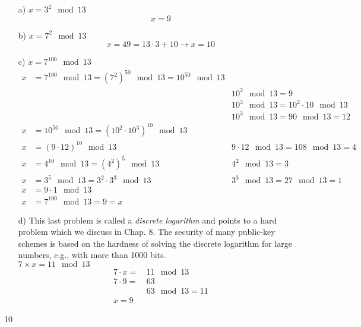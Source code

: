 \documentclass{article}
\begin{document}
\begin{enumerate}
  \setlength{\itemsep}{20pt}%
  \item[a)]  $x = 3^2 \mod 13$
  $$ \boxed{x = 9} $$

  \item[b)] $x = 7^2 \mod 13$
  $$ x = 49 = 13 \cdot 3 + 10 \rightarrow \boxed{x = 10}$$
  \item[c)] $x = 7^{100} \mod 13$
  \begin{align*}
  x &= 7^{100} \mod 13 = (7^2)^{50} \mod 13 = 10^{50} \mod 13 	& 												\\
  	&														  	& 10^2 \mod 13 = 9								\\
  	&							  	  						  	& 10^3 \mod 13 = 10^2 \cdot 10 \mod 13 			\\
  	&														  	& 10^3 \mod 13 = 90 \mod 13 = 12				\\
  x &= 10^{50} \mod 13 = (10^2 \cdot 10^3)^{10} \mod 13 		& 												\\
  x &= (9 \cdot 12)^{10} \mod 13								& 9 \cdot 12 \mod 13 = 108 \mod 13 = 4 			\\
  x &= 4^{10} \mod 13 = (4^2)^5 \mod 13						  	& 4^2 \mod 13 = 3 \\
  x &= 3^5 \mod 13 = 3^2 \cdot 3^3 \mod 13					  	& 3^3 \mod 13 = 27 \mod 13 = 1 					\\
  x &= 9 \cdot 1 \mod 13 									  	& 												\\
  x &= 7^{100} \mod 13 = \boxed{9 = x}							&									
  \end{align*}
  
  \newpage
  \item[d)] This last problem is called a \emph{discrete logarithm} and points to a hard problem which we discuss in Chap. 8. The security of many public-key schemes is based on the hardness of solving the discrete logarithm for large numbers, e.g., with more than 1000 bits.\\$7\times x = 11 \mod 13$
  \begin{align*}
  7 \cdot x = & \, 11 \mod 13 \\
  7 \cdot 9 = & \, 63 \\
  			  & \, 63 \mod 13 = 11 \\
  \boxed{x = 9} &
  \end{align*} 
\end{enumerate}

\setcounter{subsection} {10}
\end{document}
